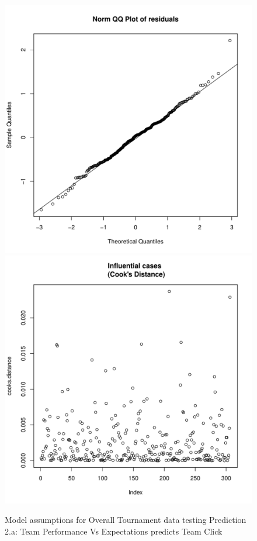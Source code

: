 \begin{CJK}{UTF8}{gbsn}
\begin{figure}[htbp]
         \includegraphics[scale =.4]{images/MLM31aQQNorm.pdf}
         \includegraphics[scale =.4]{images/MLM31aCooksD.pdf}
         \caption{Model assumptions for Overall Tournament data testing Prediction 2.a: Team Performance Vs Expectations predicts Team Click}
         \label{fig:MLM31aAssumptions}
       \end{figure}









\end{CJK}
